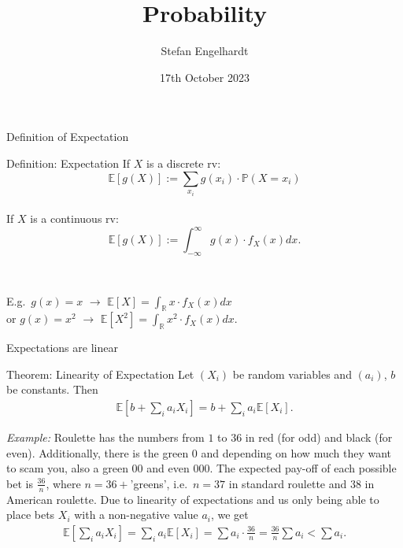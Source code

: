 \documentclass[11pt,pdf,ngerman,UKenglish]{beamer}%
\title{Probability}
\author{Stefan Engelhardt}
\date{17th October 2023}%
\newcommand{\IR}{\mathds{R}}
\newcommand{\IP}{\mathbb{P}}
\newcommand{\IE}{{\mathbb{E}}}
\newcommand{\1}{\mathbb{1}}
\theoremstyle{thm}
\theoremstyle{def}
\begin{document}
\begin{frame}
\titlepage
\end{frame}
\logo{}




\begin{frame}{Definition of Expectation}
\vspace*{-2mm}
\begin{block}{Definition: Expectation}
If $X$ is a discrete rv:
$$ \IE [ g(X) ] := \sum_{x_i} g(x_i) \cdot \IP( X = x_i)$$
\ \\
If $X$ is a continuous rv:
$$ \IE [ g(X) ] := \int_{-\infty}^\infty g(x) \cdot f_X(x) dx.$$
\end{block}
\

E.g.\ $g(x)=x$ $\to$ $\IE[X] = \int_\IR x \cdot f_X(x) dx$
\\
or $g(x) = x^2$ $\to$ $\IE[X^2] = \int_\IR x^2 \cdot f_X(x) dx.$
\end{frame}


\begin{frame}{Expectations are linear}
\begin{block}{Theorem: Linearity of Expectation}
Let $(X_i)$ be random variables and $(a_i)$, $b$ be constants. Then
\begin{align*}
\IE\left[ b + \sum_i a_i X_i \right] = b+ \sum_i a_i \IE[ X_i]
.
\end{align*}
\end{block}
\pause
\textit{Example:} Roulette has the numbers from $1$ to $36$ in red (for odd) and black (for even). Additionally, there is the green $0$ and depending on how much they want to scam you, also a green $00$ and even $000$. The expected pay-off of each possible bet is $\frac{36}{n}$, where $n= 36 +$'greens', i.e.\ $n=37$ in standard roulette and $38$ in American roulette.
\pause
Due to linearity of expectations and us only being able to place bets $X_i$ with a non-negative value $a_i$, we get
\begin{align*}
\IE\left[ \sum_i a_i X_i \right] = \sum_i a_i \IE[X_i] = \sum a_i \cdot \frac{36}{n}
= \frac{36}{n} \sum a_i < \sum a_i .
\end{align*}
\end{frame}
\end{document}
